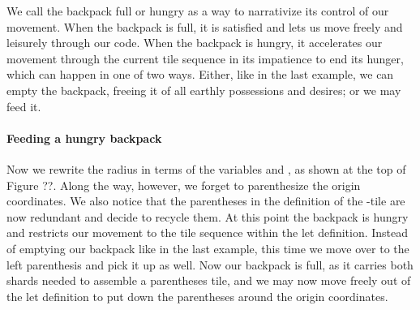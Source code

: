 
We call the backpack full or hungry as a way
to narrativize its control of our movement.
When the backpack is full, it is satisfied
and lets us move freely and leisurely through
our code.
When the backpack is hungry, it accelerates our
movement through the current tile sequence
in its impatience to end its hunger, which can happen in one of two ways.
Either, like in the last example, we can empty the backpack,
freeing it of all earthly possessions and desires;
or we may feed it.




\paragraph{Feeding a hungry backpack}
Now we rewrite the radius in terms of the variables
 and , as shown at the top of
Figure ??.
Along the way, however, we forget to parenthesize
the origin coordinates.
We also notice that the parentheses in the definition
of the -tile are now redundant and decide
to recycle them.
At this point the backpack is hungry and restricts
our movement to the tile sequence within the
let definition.
Instead of emptying our backpack like in the
last example, this time we move over to the
left parenthesis and pick it up as well.
Now our backpack is full, as it carries both shards
needed to assemble a parentheses tile, and we may
now move freely out of the let definition
to put down the parentheses around the origin coordinates.

